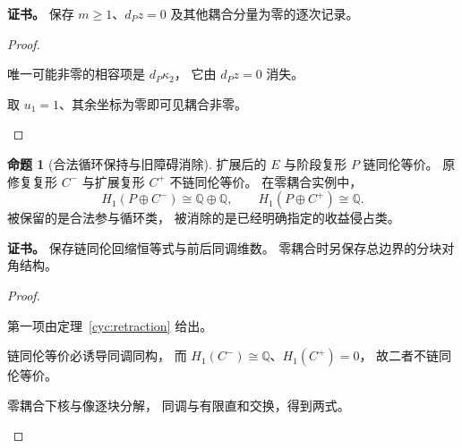 \documentclass[UTF8,12pt,a4paper,openany,fontset=none,zihao=false]{ctexrep}
\theoremstyle{definition}
\newtheorem{proposition}{命题}[chapter]
\newenvironment{certificate}{\par\noindent\textbf{证书。}\ignorespaces}{\par}
\newcommand{\1}{\mathbf 1}
\begin{document}
\begin{certificate}
保存 \(m\ge1\)、\(d_Pz=0\)
及其他耦合分量为零的逐次记录。
\end{certificate}
\begin{proof}
\begin{semanticsteps}
\item 唯一可能非零的相容项是 \(d_P\kappa_2\)，
它由 \(d_Pz=0\) 消失。
\item 取 \(u_1=1\)、其余坐标为零即可见耦合非零。
\end{semanticsteps}
\end{proof}
\begin{proposition}[合法循环保持与旧障碍消除]
\label{cyc:separate}
扩展后的 \(E\) 与阶段复形 \(P\) 链同伦等价。
原修复复形 \(C^-\) 与扩展复形 \(C^+\) 不链同伦等价。
在零耦合实例中，
\[
H_1(P\oplus C^-)\cong\mathbb Q\oplus\mathbb Q,\qquad
H_1(P\oplus C^+)\cong\mathbb Q.
\]
被保留的是合法参与循环类，
被消除的是已经明确指定的收益侵占类。
\end{proposition}
\begin{certificate}
保存链同伦回缩恒等式与前后同调维数。
零耦合时另保存总边界的分块对角结构。
\end{certificate}
\begin{proof}
\begin{semanticsteps}
\item 第一项由定理~\ref{cyc:retraction} 给出。
\item 链同伦等价必诱导同调同构，
而 \(H_1(C^-)\cong\mathbb Q\)、\(H_1(C^+)=0\)，
故二者不链同伦等价。
\item 零耦合下核与像逐块分解，
同调与有限直和交换，得到两式。
\end{semanticsteps}
\end{proof}
\end{document}
